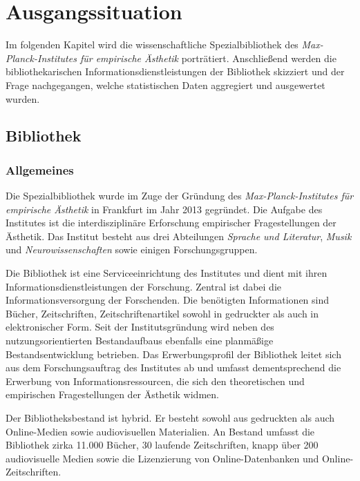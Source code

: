 \chapter{Ausgangssituation}

Im folgenden Kapitel wird die wissenschaftliche Spezialbibliothek des \textit{Max-Planck-Institutes für empirische Ästhetik} 
porträtiert. Anschließend werden die bibliothekarischen Informationsdienstleistungen der Bibliothek 
skizziert und der Frage nachgegangen, welche statistischen Daten aggregiert und ausgewertet wurden. 

\section{Bibliothek}
\subsection{Allgemeines}
Die Spezialbibliothek wurde im Zuge der Gründung des \textit{Max-Planck-Institutes für empirische Ästhetik} 
in Frankfurt im Jahr 2013 gegründet. Die Aufgabe des Institutes ist die interdisziplinäre Erforschung 
empirischer Fragestellungen der Ästhetik. Das Institut besteht aus drei Abteilungen \textit{Sprache und Literatur}, 
\textit{Musik} und \textit{Neurowissenschaften} sowie einigen Forschungsgruppen. %



Die Bibliothek ist eine Serviceeinrichtung des Institutes und dient mit ihren Informationsdienstleistungen 
der Forschung.
Zentral ist dabei die Informationsversorgung der Forschenden. Die benötigten Informationen sind Bücher, 
Zeitschriften, Zeitschriftenartikel sowohl in gedruckter als auch in elektronischer Form.
Seit der Institutsgründung wird neben des nutzungsorientierten Bestandaufbaus ebenfalls eine planmäßige 
Bestandsentwicklung betrieben. Das Erwerbungsprofil der Bibliothek leitet sich aus dem Forschungsauftrag des Institutes 
ab und umfasst dementsprechend die Erwerbung von Informationsressourcen, die sich den theoretischen und 
empirischen Fragestellungen der Ästhetik widmen.

Der Bibliotheksbestand ist hybrid. Er besteht sowohl aus gedruckten als auch Online-Medien sowie 
audiovisuellen Materialien. An Bestand umfasst die Bibliothek zirka 11.000 Bücher, 30 laufende Zeitschriften, 
knapp über 200 audiovisuelle Medien sowie die Lizenzierung von Online-Datenbanken
und Online-Zeitschriften.

